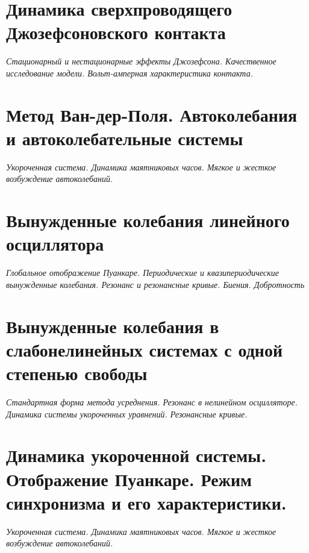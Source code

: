 \documentclass[14pt,a4paper]{extreport}
\theoremstyle{definition}
\begin{document}
\chapter{Динамика сверхпроводящего Джозефсоновского контакта}
\epigraph{\textit{Стационарный и нестационарные эффекты Джозефсона.
Качественное исследование модели. Вольт-амперная
характеристика контакта.}}{}
\label{lect11}
    

\newpage
\chapter{Метод Ван-дер-Поля. Автоколебания и автоколебательные системы}
\epigraph{\textit{Укороченная система. Динамика маятниковых часов. Мягкое и
жесткое возбуждение автоколебаний.}}{}
\label{lect12}
    

\newpage
\chapter{Вынужденные колебания линейного осциллятора}
\epigraph{\textit{Глобальное отображение Пуанкаре. Периодические и
квазипериодические вынужденные колебания. Резонанс и
резонансные кривые. Биения. Добротность}}{}
\label{lect13}
    


\newpage
\chapter{Вынужденные колебания в слабонелинейных системах
с одной степенью свободы}
\epigraph{\textit{Стандартная форма метода усреднения. Резонанс в нелинейном
осцилляторе. Динамика системы укороченных уравнений.
Резонансные кривые.}}{}
\label{lect14}
    

\newpage
\chapter{Динамика укороченной системы. Отображение Пуанкаре. Режим
синхронизма и его характеристики.}
\epigraph{\textit{Укороченная система. Динамика маятниковых часов. Мягкое и
жесткое возбуждение автоколебаний.}}{}
\label{lect15}
    

%      
\end{document}
